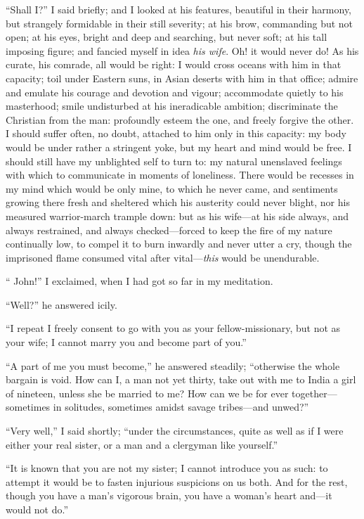\enquote{Shall I?} I said briefly; and I looked at his features,
beautiful in their harmony, but strangely formidable in their still
severity; at his brow, commanding but not open; at his eyes, bright and
deep and searching, but never soft; at his tall imposing figure; and
fancied myself in idea \emph{his wife}. Oh! it would never do! As his
curate, his comrade, all would be right: I would cross oceans with him
in that capacity; toil under Eastern suns, in Asian deserts with him in
that office; admire and emulate his courage and devotion and vigour;
accommodate quietly to his masterhood; smile undisturbed at his
ineradicable ambition; discriminate the Christian from the man:
profoundly esteem the one, and freely forgive the other. I should
suffer often, no doubt, attached to him only in this capacity: my body
would be under rather a stringent yoke, but my heart and mind would be
free. I should still have my unblighted self to turn to: my natural
unenslaved feelings with which to communicate in moments of loneliness.
There would be recesses in my mind which would be only mine, to which he
never came, and sentiments growing there fresh and sheltered which his
austerity could never blight, nor his measured warrior-march trample
down: but as his wife---at his side always, and always restrained, and
always checked---forced to keep the fire of my nature continually low,
to compel it to burn inwardly and never utter a cry, though the
imprisoned flame consumed vital after vital---\emph{this} would be
unendurable.

\enquote{\St{} John!} I exclaimed, when I had got so far in my meditation.

\enquote{Well?} he answered icily.

\enquote{I repeat I freely consent to go with you as your
	fellow-missionary, but not as your wife; I cannot marry you and become
	part of you.}

\enquote{A part of me you must become,} he answered steadily;
\enquote{otherwise the whole bargain is void. How can I, a man not yet
	thirty, take out with me to India a girl of nineteen, unless she be
	married to me? How can we be for ever together---sometimes in
	solitudes, sometimes amidst savage tribes---and unwed?}

\enquote{Very well,} I said shortly; \enquote{under the circumstances,
	quite as well as if I were either your real sister, or a man and a
	clergyman like yourself.}

\enquote{It is known that you are not my sister; I cannot introduce you
	as such: to attempt it would be to fasten injurious suspicions on us
	both. And for the rest, though you have a man's vigorous brain, you
	have a woman's heart and---it would not do.}

